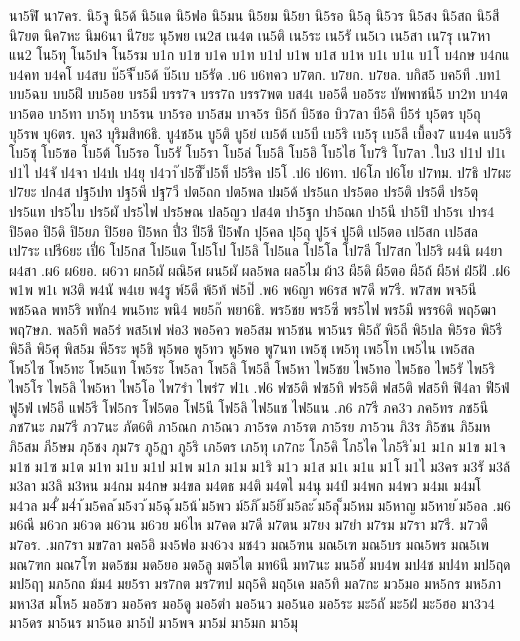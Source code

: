 {{นา5ฬิ
นา7คร.
นิ5จู
นิ5ด้
นิ5แด
นิ5ฟอ
นิ5มน
นิ5ยม
นิ5ยา
นิ5รอ
นิ5ลุ
นิ5วร
นิ5สง
นิ5สถ
นิ5สี
นิ7ยต
นิค7หะ
นิม6นา
นี7ยะ
นุ5พย
เน2ส
เน4ต
เน5ติ
เน5ระ
เน5รั
เน5เว
เน5สา
เน7รุ
เน7หา
แน2
โน5ทุ
โน5ปจ
โน5รม
บ1ก
บ1ข
บ1ค
บ1ท
บ1ป
บ1พ
บ1ส
บ1ห
บ1เ
บ1แ
บ1โ
บ4กษ
บ4กแ
บ4คท
บ4คโ
บ4สบ
บ๊5จี
็บ5ด้
บ๊5เบ
บ5รัด
.บ6
บ6ทคว
บ7ตก.
บ7ยก.
บ7ยล.
บกิส5
บค5ที
.บท1
บบ5ฉบ
บบ5ฝึ
บบ5อย
บร5มี
บรร7จ
บรร7ถ
บรร7พต
บส4เ
บอ5ดี
บอ5ระ
บัพพาชนี5
บา2ท
บา4ต
บา5ตอ
บา5ทา
บา5ทุ
บา5รน
บา5รอ
บา5สม
บาจ5ร
บิ5ก้
บิ5ชอ
บิว7ลา
บี5คิ
บี5ร่
บุ5ตร
บุ5ถุ
บุ5รพ
บุ6ตร.
บุค3
บุริมสิท6ธิ.
บู4ช5น
บู5ติ
บู5ย่
เบ5ต้
เบ5บี
เบ5ริ
เบ5รุ
เบ5ลี
เบื้อง7
แบ4ค
แบ5ริ
โบ5ชุ
โบ5ซอ
โบ5ต้
โบ5รอ
โบ5รั
โบ5รา
โบ5ล่
โบ5ลิ
โบ5อิ
โบ5ไฮ
โบ7ริ
โบ7ลา
.ใบ3
ป1ป
ป1เ
ป1ไ
ป4จั
ป4จา
ป4ปเ
ป4ยุ
ป4วา
๊ป5ซี
็ป5ท็
ป5ริค
ป5โ
.ป6
ป6ทา.
ป6โภ
ป6โย
ป7ทม.
ป7ธิ
ป7ผะ
ป7ยะ
ปก4ส
ปฐ5ปท
ปฐ5พี
ปฐ7วี
ปต5ถก
ปต5พล
ปม5ด้
ปร5แก
ปร5ตอ
ปร5ติ
ปร5ตี
ปร5ตุ
ปร5แท
ปร5ไบ
ปร5ผั
ปร5ไฟ
ปร5ษณ
ปล5ญว
ปส4ต
ปา5ฐก
ปา5ณก
ปา5นี
ปา5ปิ
ปา5รเ
ปาร4
ปิ5ดอ
ปิ5ดิ
ปิ5ยภ
ปิ5ยอ
ปิ5หก
ปี่3
ปี5ชี
ปี5ฬก
ปุ5คล
ปุ5ถุ
ปู5จ๋
ปู5ติ
เป5ตอ
เป5สก
เป5สล
เป7ระ
เปรี6ยะ
เปี่6
โป5กส
โป5แต
โป5โป
โป5ลิ
โป5แล
โป5โล
โป7ลี
โป7สก
ไป5ริ
ผ4นิ
ผ4ยา
ผ4สา
.ผ6
ผ6ยอ.
ผ6วา
ผก5ผั
ผณิ5ศ
ผน5ผั
ผล5พล
ผล5ไม
ผ้า3
ผี5ดิ
ผี5ตอ
ผี5ถ้
ผี5ห่
ฝ่5ฝั
.ฝ6
พ1พ
พ1เ
พ3ติ
พ4นั
พ4เย
พ4รู
พ์5ดี
พ้5ท้
พ่5ป๊
.พ6
พ6ญา
พ6รส
พ7ดี
พ7รี.
พ7สพ
พจ5นี
พช5ฉล
พท5ริ
พทัก4
พน5ทะ
พนิ4
พย5ก๊
พยา6ธิ.
พร5ชย
พร5ซี
พร5ไฟ
พร5มี
พรร6ดิ
พฤ5ฒา
พฤ7ษภ.
พล5ทิ
พล5ร่
พส5เฟ
พ่อ3
พอ5คว
พอ5สม
พา5ชน
พา5นร
พิ5ถั
พิ5ถี
พิ5ปล
พิ5รอ
พิ5รี
พิ5ลึ
พิ5ศุ
พิส5ม
พี5ระ
พุ5ชิ
พุ5พอ
พู5ทว
พู5พอ
พู7นท
เพ5ชุ
เพ5ทุ
เพ5โท
เพ5ไน
เพ5สล
โพ5ไซ
โพ5ทะ
โพ5แท
โพ5ระ
โพ5ลา
โพ5ลิ
โพ5ลี
โพ5หา
ไพ5ชย
ไพ5ทอ
ไพ5ธอ
ไพ5รั
ไพ5ริ
ไพ5โร
ไพ5ลิ
ไพ5หา
ไพ5โอ
ไพ7รำ
ไพร่7
ฟ1เ
.ฟ6
ฟซ5ติ
ฟซ5ทิ
ฟร5ติ
ฟส5ติ
ฟส5ทิ
ฟิ4ลา
ฟี5ฟ่
ฟู5ฟ่
เฟ5อี
แฟ5รี
โฟ5กร
โฟ5ตอ
โฟ5นี
โฟ5ลิ
ไฟ5แช
ไฟ5แน
.ภ6
ภ7รี
ภค3ว
ภค5ทร
ภช5นี
ภช7นะ
ภม7รี
ภว7นะ
ภัต6ติ
ภา5ณก
ภา5ณว
ภา5รด
ภา5รต
ภา5รย
ภา5วน
ภิ3ร
ภิ5ชน
ภิ5มห
ภิ5สม
ภี5ษม
ภุ5ชง
ภุม7ร
ภู5ฏา
ภู5ริ
เภ5ตร
เภ5ทุ
เภ7กะ
โภ5คิ
โภ5ไค
ไภ5ริ
่ม1
ม1ก
ม1ข
ม1จ
ม1ช
ม1ซ
ม1ต
ม1ท
ม1บ
ม1ป
ม1พ
ม1ภ
ม1ม
ม1ริ
ม1ว
ม1ส
ม1เ
ม1แ
ม1โ
ม1ไ
ม3คร
ม3รั
ม3ล้
ม3ลา
ม3ลิ
ม3หน
ม4กม
ม4กษ
ม4ขล
ม4ตธ
ม4ติ
ม4ตไ
ม4นุ
ม4ป์
ม4พก
ม4พว
ม4มเ
ม4มโ
ม4วล
ม4ั่
ม4่า
้ม5คล
้ม5งว
้ม5ฉุ
้ม5น้
่ม5พว
ม์5ภิ
้ม5ยิ
้ม5ละ
้ม5ลุ
็ม5หม
ม5หาญ
ม5หาย
้ม5อล
.ม6
ม6ณี
ม6วก
ม6วด
ม6วน
ม6วย
ม6ไห
ม7คด
ม7ดี
ม7ตน
ม7ยง
ม7ยำ
ม7รม
ม7รา
ม7รี.
ม7วดี
ม7อร.
.มก7รา
มข7ลา
มค5อิ
มง5ฟอ
มง6วง
มช4ว
มณ5ฑน
มณ5เฑ
มณ5บร
มณ5พร
มณ5เพ
มณ7ฑก
มณ7โฑ
มด5ชม
มด5ยอ
มด5ลู
มต5ไต
มท6นี
มท7นะ
มน5ฮั
มบ4พ
มป4ช
มป4ท
มป5ฤด
มป5ฤๅ
มภ5กถ
ม้ม4
มย5รา
มร7กต
มร7ฑป
มฤ5คิ
มฤ5เค
มล5ทิ
มล7กะ
มว5มอ
มห5กร
มห5ภา
มหา3ส
มโห5
มอ5ขว
มอ5คร
มอ5ดู
มอ5ตำ
มอ5นว
มอ5นอ
มอ5ระ
มะ5ถั
มะ5ฝ่
มะ5ฮอ
มา3ว4
มา5ดร
มา5นร
มา5นอ
มา5ป่
มา5พจ
มา5ม่
มา5มก
มา5มุ
}}
